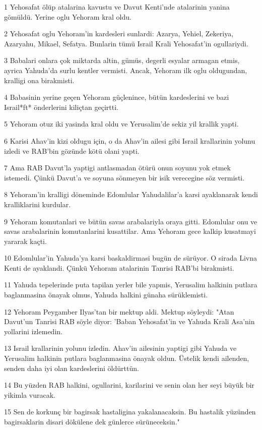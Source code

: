 \par 1 Yehosafat ölüp atalarina kavustu ve Davut Kenti'nde atalarinin yanina gömüldü. Yerine oglu Yehoram kral oldu.
\par 2 Yehosafat oglu Yehoram'in kardesleri sunlardi: Azarya, Yehiel, Zekeriya, Azaryahu, Mikael, Sefatya. Bunlarin tümü Israil Krali Yehosafat'in ogullariydi.
\par 3 Babalari onlara çok miktarda altin, gümüs, degerli esyalar armagan etmis, ayrica Yahuda'da surlu kentler vermisti. Ancak, Yehoram ilk oglu oldugundan, kralligi ona birakmisti.
\par 4 Babasinin yerine geçen Yehoram güçlenince, bütün kardeslerini ve bazi Israil*ft* önderlerini kiliçtan geçirtti.
\par 5 Yehoram otuz iki yasinda kral oldu ve Yerusalim'de sekiz yil krallik yapti.
\par 6 Karisi Ahav'in kizi oldugu için, o da Ahav'in ailesi gibi Israil krallarinin yolunu izledi ve RAB'bin gözünde kötü olani yapti.
\par 7 Ama RAB Davut'la yaptigi antlasmadan ötürü onun soyunu yok etmek istemedi. Çünkü Davut'a ve soyuna sönmeyen bir isik verecegine söz vermisti.
\par 8 Yehoram'in kralligi döneminde Edomlular Yahudalilar'a karsi ayaklanarak kendi kralliklarini kurdular.
\par 9 Yehoram komutanlari ve bütün savas arabalariyla oraya gitti. Edomlular onu ve savas arabalarinin komutanlarini kusattilar. Ama Yehoram gece kalkip kusatmayi yararak kaçti.
\par 10 Edomlular'in Yahuda'ya karsi baskaldirmasi bugün de sürüyor. O sirada Livna Kenti de ayaklandi. Çünkü Yehoram atalarinin Tanrisi RAB'bi birakmisti.
\par 11 Yahuda tepelerinde puta tapilan yerler bile yapmis, Yerusalim halkinin putlara baglanmasina önayak olmus, Yahuda halkini günaha sürüklemisti.
\par 12 Yehoram Peygamber Ilyas'tan bir mektup aldi. Mektup söyleydi: "Atan Davut'un Tanrisi RAB söyle diyor: 'Baban Yehosafat'in ve Yahuda Krali Asa'nin yollarini izlemedin.
\par 13 Israil krallarinin yolunu izledin. Ahav'in ailesinin yaptigi gibi Yahuda ve Yerusalim halkinin putlara baglanmasina önayak oldun. Üstelik kendi ailenden, senden daha iyi olan kardeslerini öldürttün.
\par 14 Bu yüzden RAB halkini, ogullarini, karilarini ve senin olan her seyi büyük bir yikimla vuracak.
\par 15 Sen de korkunç bir bagirsak hastaligina yakalanacaksin. Bu hastalik yüzünden bagirsaklarin disari dökülene dek günlerce sürüneceksin."
